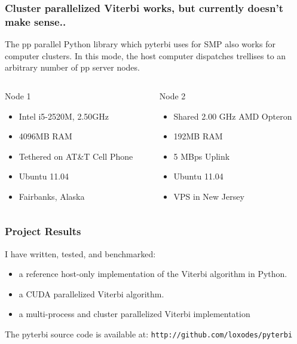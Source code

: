 \documentclass{beamer}
\begin{document}
    \begin{frame}
        \frametitle{Cluster parallelized Viterbi works, but currently doesn't make sense..}
        
        The pp parallel Python library which pyterbi uses for SMP also works for computer clusters.
        In this mode, the host computer dispatches trellises to an arbitrary number of pp server nodes. 
        
        \begin{columns}[t]
            \begin{column}[t]{.5\linewidth}
            \begin{block}{Node 1}
            \begin{itemize}
                \item Intel i5-2520M, 2.50GHz
                \item 4096MB RAM
                \item Tethered on AT\&T Cell Phone
                \item Ubuntu 11.04
                \item Fairbanks, Alaska
            \end{itemize}
            \end{block}
            \end{column}
            
            \begin{column}[t]{.5\linewidth}
            \begin{block}{Node 2}
            \begin{itemize}
                \item Shared 2.00 GHz AMD Opteron
                \item 192MB RAM
                \item 5 MBps Uplink
                \item Ubuntu 11.04
                \item VPS in New Jersey
            \end{itemize}
            \end{block}
            \end{column}
        \end{columns}
    \end{frame}

    \begin{frame}
        \frametitle{Project Results}
        I have written, tested, and benchmarked:
        \begin{itemize}
            \item a reference host-only implementation of the Viterbi algorithm in Python. 
            \item a CUDA parallelized Viterbi algorithm.
            \item a multi-process and cluster parallelized Viterbi implementation 
        \end{itemize}

        The pyterbi source code is available at: \texttt{http://github.com/loxodes/pyterbi}
   \end{frame}
\end{document}
